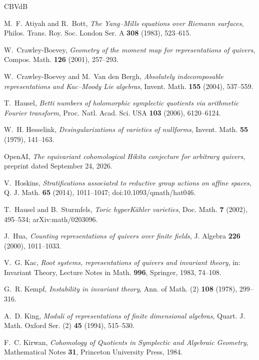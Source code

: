 \documentclass[11pt]{amsart}
\theoremstyle{definition}
\theoremstyle{remark}
\numberwithin{equation}{section}
\begin{document}
\begin{thebibliography}{CBVdB}

M.~F. Atiyah and R.~Bott, \emph{The Yang--Mills equations over Riemann surfaces},
Philos. Trans. Roy. Soc. London Ser. A \textbf{308} (1983), 523--615.

W.~Crawley-Boevey, \emph{Geometry of the moment map for representations of quivers}, Compos. Math.
\textbf{126} (2001), 257--293.

W.~Crawley-Boevey and M.~Van den Bergh, \emph{Absolutely indecomposable representations and Kac--Moody
Lie algebras}, Invent. Math. \textbf{155} (2004), 537--559.

T.~Hausel, \emph{Betti numbers of holomorphic symplectic quotients via arithmetic Fourier transform},
Proc. Natl. Acad. Sci. USA \textbf{103} (2006), 6120--6124.

W.~H. Hesselink, \emph{Desingularizations of varieties of nullforms}, Invent. Math. \textbf{55} (1979),
141--163.

OpenAI, \emph{The equivariant cohomological Hikita conjecture for arbitrary quivers}, preprint dated
September 24, 2026.

V.~Hoskins, \emph{Stratifications associated to reductive group actions on affine spaces},
Q. J. Math. \textbf{65} (2014), 1011--1047; doi:10.1093/qmath/hat046.

T.~Hausel and B.~Sturmfels, \emph{Toric hyperK\"ahler varieties}, Doc. Math. \textbf{7} (2002), 495--534;
arXiv:math/0203096.

J.~Hua, \emph{Counting representations of quivers over finite fields}, J. Algebra \textbf{226} (2000),
1011--1033.

V.~G. Kac, \emph{Root systems, representations of quivers and invariant theory}, in: Invariant Theory,
Lecture Notes in Math. \textbf{996}, Springer, 1983, 74--108.

G.~R. Kempf, \emph{Instability in invariant theory}, Ann. of Math. (2) \textbf{108} (1978), 299--316.

A.~D. King, \emph{Moduli of representations of finite dimensional algebras}, Quart. J. Math. Oxford
Ser. (2) \textbf{45} (1994), 515--530.

F.~C. Kirwan, \emph{Cohomology of Quotients in Symplectic and Algebraic Geometry}, Mathematical Notes
\textbf{31}, Princeton University Press, 1984.


\end{thebibliography}
\end{document}
